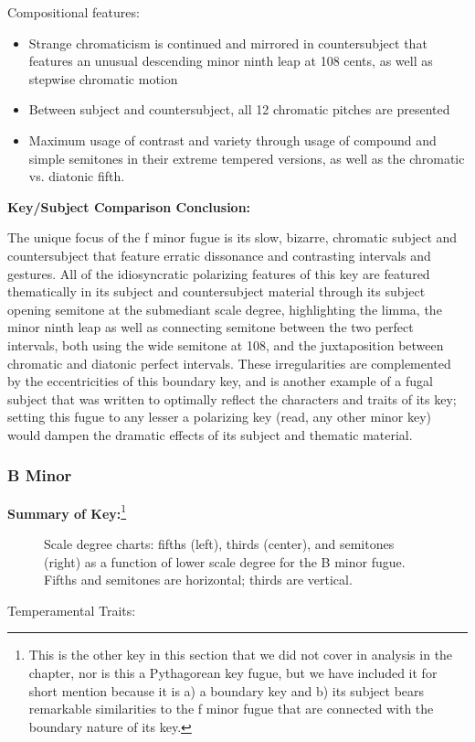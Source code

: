 Compositional features:

\begin{itemize}
\tightlist
\item
  Strange chromaticism is continued and mirrored in countersubject that
  features an unusual descending minor ninth leap at 108 cents, as well
  as stepwise chromatic motion
\item
  Between subject and countersubject, all 12 chromatic pitches are
  presented
\item
  Maximum usage of contrast and variety through usage of compound and
  simple semitones in their extreme tempered versions, as well as the
  chromatic vs. diatonic fifth.
\end{itemize}

\textbf{Key/Subject Comparison Conclusion:}

The unique focus of the f minor fugue is its slow, bizarre, chromatic
subject and countersubject that feature erratic dissonance and
contrasting intervals and gestures. All of the idiosyncratic polarizing
features of this key are featured thematically in its subject and
countersubject material through its subject opening semitone at the
submediant scale degree, highlighting the limma, the minor ninth leap as
well as connecting semitone between the two perfect intervals, both
using the wide semitone at 108, and the juxtaposition between chromatic
and diatonic perfect intervals. These irregularities are complemented by
the eccentricities of this boundary key, and is another example of a
fugal subject that was written to optimally reflect the characters and
traits of its key; setting this fugue to any lesser a polarizing key
(read, any other minor key) would dampen the dramatic effects of its
subject and thematic material.

    \subsubsection{B Minor}\label{b-minor}

\textbf{Summary of
Key:}\footnote{This is the other key in this section that we did not cover in analysis in the chapter, nor is this a Pythagorean key fugue, but we have included it for short mention because it is a) a boundary key and b) its subject bears remarkable similarities to the f minor fugue that are connected with the boundary nature of its key.}



\begin{figure}[H]
\vspace{1.5em}
    \centering
    \caption[Scale degree charts: fifths, thirds, and semitones as a function of lower scale degree for the B minor fugue. ]{Scale degree charts: fifths (left), thirds (center), and semitones (right) as a function of lower scale degree for the B minor fugue. Fifths and semitones are horizontal; thirds are vertical.}
\end{figure}    Temperamental Traits:

